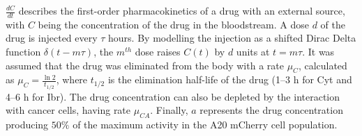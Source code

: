 \vspace{0.4cm}
$\frac{dC}{dt}$ describes the first-order pharmacokinetics of a drug with an external source, with $C$ being the concentration of the drug in the bloodstream. A dose $d$ of the drug is injected every $\tau$ hours. By modelling the injection as a shifted Dirac Delta function $\delta (t - m\tau)$, the $m^{th}$ dose raises $C(t)$ by $d$ units at $t=m\tau$. It was assumed that the drug was eliminated from the body with a rate $\mu_C$, calculated as $\mu_C = \frac{\ln 2}{t_{1/2}}$, where $t_{1/2}$ is the elimination half-life of the drug (1–3 h for Cyt and 4–6 h for Ibr). The drug concentration can also be depleted by the interaction with cancer cells, having rate $\mu_{CA}$. Finally, $a$ represents the drug concentration producing $50\%$ of the maximum activity in the A20 mCherry cell population. 
